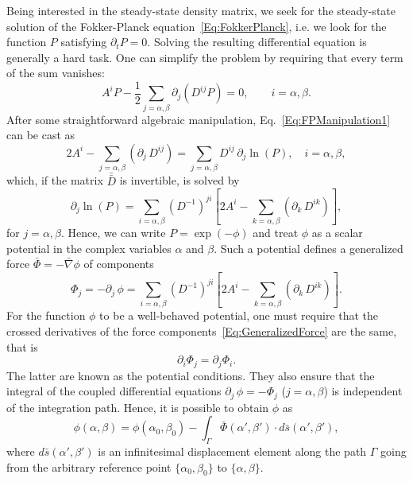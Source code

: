 Being interested in the steady-state density matrix, we seek for the steady-state solution of the Fokker-Planck equation~\eqref{Eq:FokkerPlanck}, i.e. we look for the function $P$ satisfying $\partial_t P=0$. 
Solving the resulting differential equation is generally a hard task.
One can simplify the problem by requiring that every term of the sum vanishes:
\begin{equation}\label{Eq:FPManipulation1}
A^i P
- \frac{1}{2} \sum_{j=\alpha,\beta} \partial_j \left(D^{ij} P \right)=0,
\qquad i=\alpha,\beta.
\end{equation}
After some straightforward algebraic manipulation, Eq.~\eqref{Eq:FPManipulation1} can be cast as
\begin{equation}\label{Eq:FPManipulation2}
2A^i - \sum_{j=\alpha,\beta} \left(\partial_j\,D^{ij}\right)=
\sum_{j=\alpha,\beta} D^{ij}\, \partial_j \ln(P),
\quad i=\alpha,\beta,
\end{equation}
which, if the matrix $\bar{\bar{D}}$ is invertible, is solved by
\begin{equation}\label{Eq:FPManipulation3}
\partial_j \ln(P) = \sum_{i=\alpha,\beta} \left(D^{-1}\right)^{ji}
\left[2A^i - \sum_{k=\alpha,\beta} \left(\partial_k\,D^{ik}\right)\right],
\end{equation}
for $j=\alpha,\beta$.
Hence, we can write $P=\exp(-\phi)$ and treat $\phi$ as a scalar potential in the complex variables $\alpha$ and $\beta$.
Such a potential defines a generalized force $\bar{\Phi}=-\bar{\nabla}\phi$ of components
\begin{equation}\label{Eq:GeneralizedForce}
\Phi_j=-\partial_j\,\phi=\sum_{i=\alpha,\beta}
\left(D^{-1}\right)^{ji}
\left[2A^i - \sum_{k=\alpha,\beta} \left(\partial_k\,D^{ik}\right)\right].
\end{equation}
For the function $\phi$ to be a well-behaved potential, one must require that the crossed derivatives of the force components~\eqref{Eq:GeneralizedForce} are the same, that is
\begin{equation}\label{Eq:PotentialConditions}
\partial_i \Phi_j=\partial_j \Phi_i.
\end{equation}
The latter are known as the potential conditions.
They also ensure that the integral of the coupled differential equations $\partial_j\,\phi=-\Phi_j$ ($j=\alpha,\beta$) is independent of the integration path.
Hence, it is possible to obtain $\phi$ as
\begin{equation}\label{Eq:GeneralPotentialIntegral}
\phi(\alpha,\beta)=\phi(\alpha_0,\beta_0)-\int_\Gamma \bar{\Phi}(\alpha',\beta')\cdot d\bar{s}(\alpha',\beta'),
\end{equation}
where $d\bar{s}(\alpha',\beta')$ is an infinitesimal displacement element along the path $\Gamma$ going from the arbitrary reference point $\{\alpha_0,\beta_0\}$ to $\{\alpha,\beta\}$.


